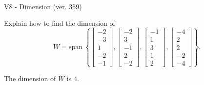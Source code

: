 \begin{exercise}
  \begin{exerciseTitle}V8 - Dimension (ver. 359)\end{exerciseTitle}
  \begin{exerciseStatement}
    Explain how to find the dimension of 
\[W=\mathrm{span}\ \left\{\left[\begin{array}{r}
-2 \\
-3 \\
1 \\
-2 \\
-1
\end{array}\right] , \left[\begin{array}{r}
-2 \\
3 \\
-1 \\
2 \\
-2
\end{array}\right] , \left[\begin{array}{r}
-1 \\
1 \\
3 \\
1 \\
2
\end{array}\right] , \left[\begin{array}{r}
-4 \\
2 \\
2 \\
-2 \\
-4
\end{array}\right]\right\}.\]



  \end{exerciseStatement}
  \begin{exerciseAnswer}
   The dimension of \(W\) is  \(4\).
  


  \end{exerciseAnswer}
\end{exercise}